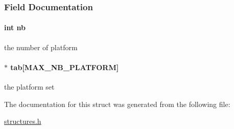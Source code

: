 \subsubsection{Field Documentation}
\hypertarget{structplatform_set_ab310c6afcc676eab3930dce2650511c0}{
\paragraph[{nb}]{\setlength{\rightskip}{0pt plus 5cm}int nb}}\label{structplatform_set_ab310c6afcc676eab3930dce2650511c0}
the number of platform \hypertarget{structplatform_set_adc68016a9ab856bd20fb14c5c71c234a}{
\paragraph[{tab}]{$\ast$ tab\mbox{[}{\bf M\-A\-X\-\_\-\-N\-B\-\_\-\-P\-L\-A\-T\-F\-O\-R\-M}\mbox{]}}}\label{structplatform_set_adc68016a9ab856bd20fb14c5c71c234a}
the platform set 

The documentation for this struct was generated from the following file\-:\begin{DoxyCompactItemize}
\item 
\hyperlink{structures_8h}{structures.\-h}\end{DoxyCompactItemize}
